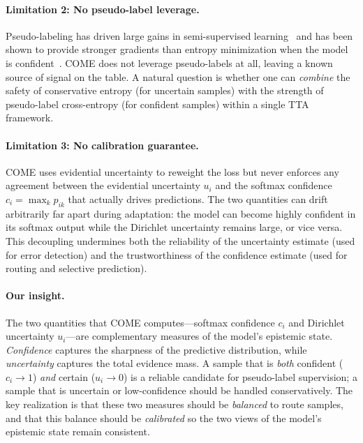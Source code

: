\paragraph{Limitation 2: No pseudo-label leverage.}
Pseudo-labeling has driven large gains in semi-supervised learning~\citep{sohn2020fixmatch,xie2020selftraining,lee2013pseudo} and has been shown to provide stronger gradients than entropy minimization when the model is confident~\citep{prabhu2023lada,chen2023minimize}. COME does not leverage pseudo-labels at all, leaving a known source of signal on the table. A natural question is whether one can \emph{combine} the safety of conservative entropy (for uncertain samples) with the strength of pseudo-label cross-entropy (for confident samples) within a single TTA framework.

\paragraph{Limitation 3: No calibration guarantee.}
COME uses evidential uncertainty to reweight the loss but never enforces any agreement between the evidential uncertainty $u_i$ and the softmax confidence $c_i = \max_k p_{ik}$ that actually drives predictions. The two quantities can drift arbitrarily far apart during adaptation: the model can become highly confident in its softmax output while the Dirichlet uncertainty remains large, or vice versa. This decoupling undermines both the reliability of the uncertainty estimate (used for error detection) and the trustworthiness of the confidence estimate (used for routing and selective prediction).

\paragraph{Our insight.}
The two quantities that COME computes---softmax confidence $c_i$ and Dirichlet uncertainty $u_i$---are complementary measures of the model's epistemic state. \emph{Confidence} captures the sharpness of the predictive distribution, while \emph{uncertainty} captures the total evidence mass. A sample that is \emph{both} confident ($c_i \to 1$) \emph{and} certain ($u_i \to 0$) is a reliable candidate for pseudo-label supervision; a sample that is uncertain or low-confidence should be handled conservatively. The key realization is that these two measures should be \emph{balanced} to route samples, and that this balance should be \emph{calibrated} so the two views of the model's epistemic state remain consistent.

